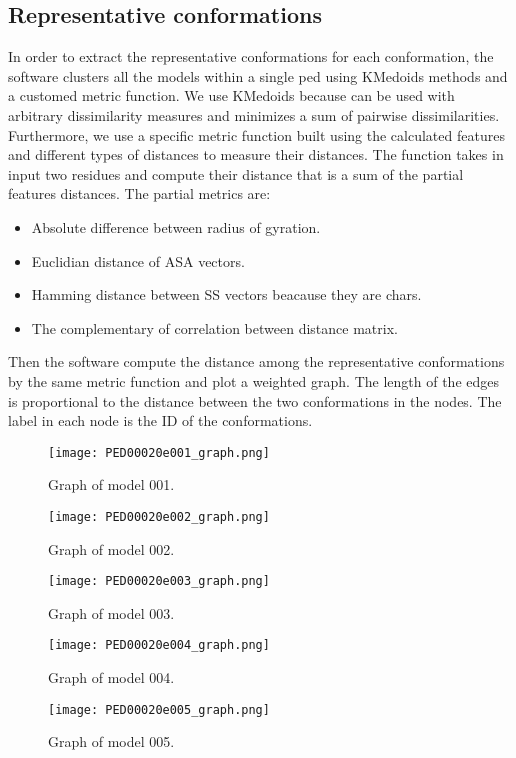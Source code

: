 \subsection{Representative conformations} 
In order to extract the representative conformations for each conformation, the software clusters all the models within a single ped using KMedoids methods and a customed metric function. 
We use KMedoids because can be used with arbitrary dissimilarity measures and minimizes a sum of pairwise dissimilarities. 
Furthermore, we use a specific metric function built using the calculated features and different types of distances to measure their distances. The function takes in input two residues and compute their distance that is a sum of the partial features distances.
The partial metrics are: 
\begin{itemize}
\item Absolute difference between radius of gyration.
\item Euclidian distance of ASA vectors.
\item Hamming distance between SS vectors beacause they are chars.
\item The complementary of correlation between distance matrix. 
\end{itemize}

Then the software compute the distance among the representative conformations by the same metric function and plot a weighted graph. The length of the edges is proportional to the distance between the two conformations in the nodes. The label in each node is the ID of the conformations.

\begin{figure}[H]
	\begin{minipage}[b]{0.47\textwidth}
		\centering
		\texttt{[image: PED00020e001\_graph.png]}
		\caption{Graph of model 001.}
		\label{model001}
	\end{minipage}
	\hfill
	\begin{minipage}[b]{0.47\textwidth}
		\centering
		\texttt{[image: PED00020e002\_graph.png]}
		\caption{Graph of model 002.}
		\label{model002}
	\end{minipage}
	\hfill
	\begin{minipage}[b]{0.47\textwidth}
		\centering
		\texttt{[image: PED00020e003\_graph.png]}
		\caption{Graph of model 003.}
		\label{model003}
	\end{minipage}
	\begin{minipage}[b]{0.47\textwidth}
		\centering
		\texttt{[image: PED00020e004\_graph.png]}
		\caption{Graph of model 004.}
		\label{model004}
	\end{minipage}
	\hfill
	\begin{minipage}[b]{0.47\textwidth}
		\centering
		\texttt{[image: PED00020e005\_graph.png]}
		\caption{Graph of model 005.}
		\label{model005}
	\end{minipage}
	\end{figure}


